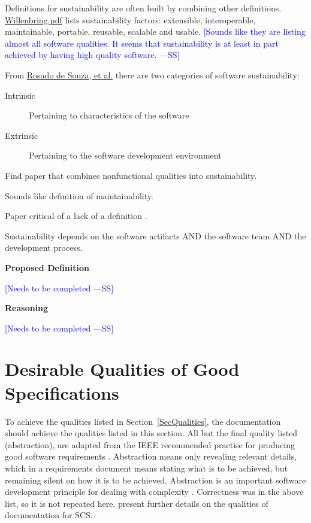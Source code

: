\documentclass[letterpaper,cleveref]{lipics-v2019}
\newcommand{\authornote}[3]{\textcolor{#1}{[#3 ---#2]}}
\newcommand{\authornote}[3]{}
\newcommand{\wss}[1]{\authornote{blue}{SS}{#1}} %
\theoremstyle{definition}
\begin{document}
Definitions for sustainability are often built by combining other definitions.
\href{https://collegeville.github.io/CW3S19/WorkshopResources/Presentations/1-4-2019CollegevilleWorkshopWillenbring.pdf}
{Willenbring.pdf}
lists sustainability factors: extensible, interoperable, maintainable, portable,
reusable, scalable and usable.  \wss{Sounds like they are listing almost all
  software qualities.  It seems that sustainability is at least in part achieved
  by having high quality software.}

From
\href{https://figshare.com/articles/Defining_Sustainability_through_Developers_Eyes_Recommendations_from_an_Interview_Study/1111925/1}
{Rosado de Souza, et al.} there are two categories of software sustainability:

\begin{description}
\item[Intrinsic] Pertaining to characteristics of the software
\item[Extrinsic] Pertaining to the software development environment
\end{description}
Find paper that combines nonfunctional qualities into sustainability.

Sounds like definition of maintainability.

Paper critical of a lack of a definition \citep{VentersEtAl2014}.

Sustainability depends on the software artifacts AND the software team AND the
development process.

\noindent \textbf{Proposed Definition} 

\wss{Needs to be completed}

\noindent \textbf{Reasoning}

\wss{Needs to be completed}

\section{Desirable Qualities of Good Specifications} \label{SecDesirableQs}

To achieve the qualities listed in Section~\ref{SecQualities}, the documentation
should achieve the qualities listed in this section.  All but the final quality
listed (abstraction), are adapted from the IEEE recommended practise for
producing good software requirements \citep{IEEE1998}.  Abstraction means only
revealing relevant details, which in a requirements document means stating what
is to be achieved, but remaining silent on how it is to be achieved.
Abstraction is an important software development principle for dealing with
complexity \citep[p.~40]{GhezziEtAl2003}.  Correctness was in the above list, so
it is not repeated here.  \citet{SmithAndKoothoor2016} present further details
on the qualities of documentation for SCS.
\end{document}
